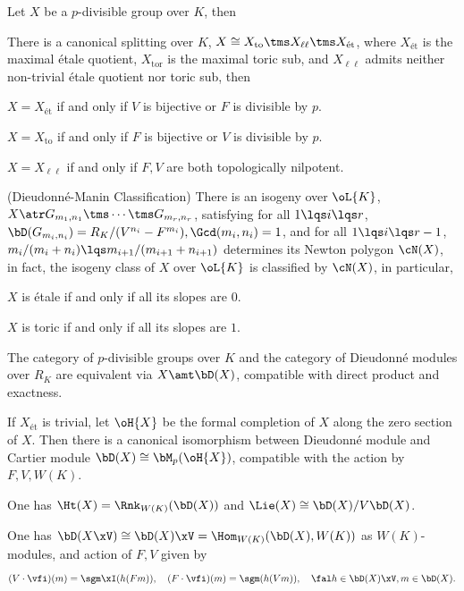 \documentclass[a4paper, twoside]{article}
\begin{document}
\begin{thm}[{\cite[4.31, 4.33, 4.37, 4.42]{CO2009}}]
	Let $X$ be a $p$-divisible group over $K$, then
	\begin{enr}
			\item There is a canonical splitting over $K$, $X\cong X_{\text{to}}\tms X_{\ell\ell}\tms X_{\text{{\'e}t}}$, where $X_{\text{{\'e}t}}$ is the maximal {\'e}tale quotient, $X_{\text{tor}}$ is the maximal toric sub, and $X_{\ell\ell}$ admits neither non-trivial {\'e}tale quotient nor toric sub, then
		\begin{enr}
				\item $X=X_{\text{{\'e}t}}$ if and only if $V$ is bijective or $F$ is divisible by $p$.
				\item $X=X_{\text{to}}$ if and only if $F$ is bijective or $V$ is divisible by $p$.
				\item $X=X_{\ell\ell}$ if and only if $F,V$ are both topologically nilpotent.
		\end{enr}
			\item (Dieudonn{\'e}-Manin Classification) There is an isogeny over $\oL{K}$, $X\atr G_{m_{1},n_{1}}\tms\cdots\tms G_{m_{r},n_{r}}$, satisfying for all $1\lqs i\lqs r$, $\bD(G_{m_{i},n_{i}})=R_{K}/(V^{n_{i}}-F^{m_{i}}), \Gcd(m_{i},n_{i})=1$, and for all $1\lqs i\lqs r-1$, $m_{i}/(m_{i}+n_{i})\lqs m_{i+1}/(m_{i+1}+n_{i+1})$ determines its Newton polygon $\cN(X)$, in fact, the isogeny class of $X$ over $\oL{K}$ is classified by $\cN(X)$, in particular,
		\begin{enr}
				\item $X$ is {\'e}tale if and only if all its slopes are $0$.
				\item $X$ is toric if and only if all its slopes are $1$.
		\end{enr}
			\item The category of $p$-divisible groups over $K$ and the category of Dieudonn{\'e} modules over $R_{K}$ are equivalent via $X\amt\bD(X)$, compatible with direct product and exactness.
			\item If $X_{\text{{\'e}t}}$ is trivial, let $\oH{X}$ be the formal completion of $X$ along the zero section of $X$. Then there is a canonical isomorphism between Dieudonn{\'e} module and Cartier module $\bD(X)\cong\bM_{p}(\oH{X})$, compatible with the action by $F,V,W(K)$.
			\item One has $\Ht(X)=\Rnk_{W(K)}(\bD(X))$ and $\Lie(X)\cong\bD(X)/V\bD(X)$.
			\item One has $\bD(X\xV)\cong\bD(X)\xV=\Hom_{W(K)}(\bD(X),W(K))$ as $W(K)$-modules, and action of $F,V$ given by
		\[
			(V\cdot\vfi)(m)=\sgm\xI(h(Fm)),\quad(F\cdot\vfi)(m)=\sgm(h(Vm)),\quad\fal h\in\bD(X)\xV, m\in\bD(X).
		\]
	\end{enr}
\end{thm}
\end{document}
